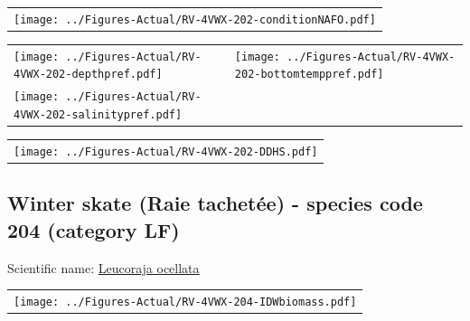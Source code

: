 \documentclass[12pt]{article}\usepackage[]{graphicx}\usepackage[]{color}
\begin{document}
\vspace{1cm}
\begin{minipage}{1.0\textwidth}
 \begin{tabular}{c}
\texttt{[image: ../Figures-Actual/RV-4VWX-202-conditionNAFO.pdf]} \\ 
\end{tabular} 
\end{minipage}
\clearpage
\begin{minipage}{1.0\textwidth}
 \begin{tabular}[t]{m{3in}m{3in}}
\texttt{[image: ../Figures-Actual/RV-4VWX-202-depthpref.pdf]} & 
\texttt{[image: ../Figures-Actual/RV-4VWX-202-bottomtemppref.pdf]} \\ 
\texttt{[image: ../Figures-Actual/RV-4VWX-202-salinitypref.pdf]} & 
 \\ 
\end{tabular} 
\end{minipage}
\newline

\vspace{1cm}
\begin{minipage}{1.0\textwidth}
 \begin{tabular}{c}
\texttt{[image: ../Figures-Actual/RV-4VWX-202-DDHS.pdf]} \\ 
\end{tabular} 
\end{minipage}
\clearpage

\renewcommand\thefigure{\thesubsection\Alph{figure}}

\setcounter{figure}{0}

\hypertarget{sec:204}{%
\subsection{Winter skate (Raie tachetée) - species code 204 (category LF)}\label{sec:204}}

  


Scientific name: \href{http://www.marinespecies.org/aphia.php?p=taxdetails\&id=158553}{Leucoraja ocellata} \newline
\begin{minipage}{1.0\textwidth}
 \begin{tabular}{c}
\texttt{[image: ../Figures-Actual/RV-4VWX-204-IDWbiomass.pdf]} \\ 
\end{tabular} 
\end{minipage}
\newline
\end{document}
